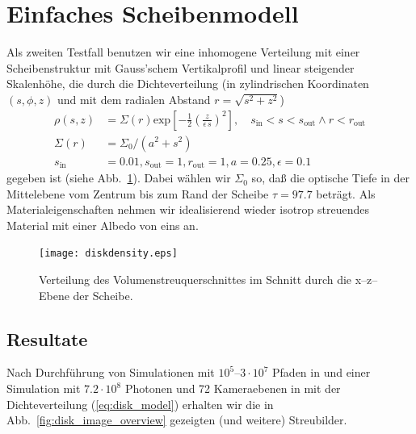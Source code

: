 	\section{Einfaches Scheibenmodell}
	Als zweiten Testfall benutzen wir eine inhomogene Verteilung mit einer Scheibenstruktur mit Gauss'schem Vertikalprofil und linear steigender Skalenhöhe, die durch die Dichteverteilung (in zylindrischen Koordinaten $(s,\phi,z)$ und mit dem radialen Abstand $r=\sqrt{s^2+z^2}$)
	\begin{align}
		\rho(s,z)&=\Sigma(r)\text{exp}\left[-\frac{1}{2}\left(\frac{z}{\epsilon\,s}\right)^2\right],\quad s_\text{in}<s<s_\text{out}\land r<r_\text{out} \nonumber\\
		\Sigma(r)&=\Sigma_0 / (a^2+s^2) \label{eq:disk_model} \\
		s_\text{in}&=0.01, s_\text{out}=1, r_\text{out}=1, a=0.25, \epsilon=0.1 \nonumber
	\end{align}
	gegeben ist (siehe Abb.~\ref{fig:diskdensity}).	Dabei wählen wir $\Sigma_0$ so, daß die optische Tiefe in der Mittelebene vom Zentrum bis zum Rand der Scheibe $\tau=97.7$ beträgt. Als Materialeigenschaften nehmen wir idealisierend wieder isotrop streuendes Material mit einer Albedo von eins an.
	
		\begin{figure}
			\centering
			\texttt{[image: diskdensity.eps]}
			\caption{Verteilung des Volumenstreuquerschnittes im Schnitt durch die x--z--Ebene der Scheibe.}
			\label{fig:diskdensity}
		\end{figure}
	
	\subsection{Resultate}
		Nach Durchführung von Simulationen mit $10^5$--$3\cdot 10^7$ Pfaden in \pirate und einer Simulation mit $7.2\cdot 10^8$ Photonen und 72 Kameraebenen in \mctd mit der Dichteverteilung (\ref{eq:disk_model}) erhalten wir die in Abb.~\ref{fig:disk_image_overview} gezeigten (und weitere) Streubilder.
		
